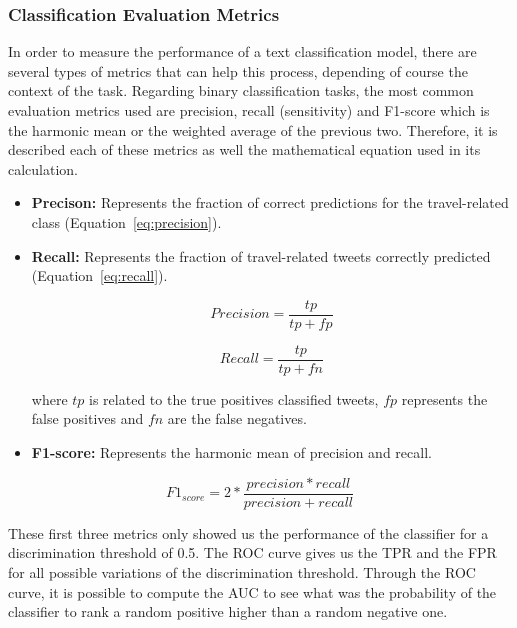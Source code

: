 \subsubsection{Classification Evaluation Metrics}
\label{subsubsec:evaluation_metrics}
In order to measure the performance of a text classification model, there are several types of metrics that can help this process, depending of course the context of the task. Regarding binary classification tasks, the most common evaluation metrics used are precision, recall (sensitivity) and F1-score which is the harmonic mean or the weighted average of the previous two. Therefore, it is described each of these metrics as well the mathematical equation used in its calculation.

\begin{itemize}
	\item \textbf{Precison:} Represents the fraction of correct predictions for the travel-related class (Equation~\ref{eq:precision}).
	
	\item \textbf{Recall:} Represents the fraction of travel-related tweets correctly predicted (Equation~\ref{eq:recall}).
	\begin{multicols}{2}
		\begin{equation}\label{eq:precision}
		Precision = \frac{tp}{tp+fp}
		\end{equation}
		
		\begin{equation}\label{eq:recall}
		Recall = \frac{tp}{tp+fn}
		\end{equation}
		\end{multicols}
		
		where \textbf{$tp$} is related to the true positives classified tweets, \textbf{$fp$} represents the false positives and \textbf{$fn$} are the false negatives.
		
		\item \textbf{F1-score:} Represents the harmonic mean of precision and recall.
		\end{itemize}
		
		\begin{equation}
		{F1}_{score} = 2*\frac{precision*recall}{precision+recall}
		\end{equation}
		
These first three metrics only showed us the performance of the classifier for a discrimination threshold of 0.5. The \gls{ROC} curve gives us the \gls{TPR} and the \gls{FPR} for all possible variations of the discrimination threshold. Through the \gls{ROC} curve, it is possible to compute the \gls{AUC} to see what was the probability of the classifier to rank a random positive higher than a random negative one.

